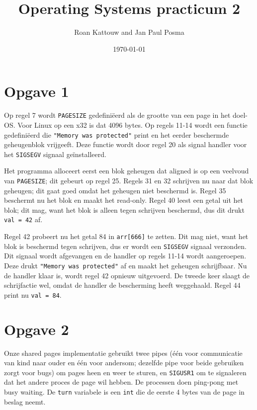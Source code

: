 \documentclass[11pt]{article}
\begin{document}
\author{Roan Kattouw and Jan Paul Posma}
\date{\today}
\title{Operating Systems practicum 2}

\maketitle

\section*{Opgave 1}
Op regel 7 wordt \verb+PAGESIZE+ gedefini\"eerd als de grootte van een page in het doel-OS.
Voor Linux op een x32 is dat 4096 bytes. Op regels 11-14 wordt een functie gedefini\"eerd die
\verb+"Memory was protected"+ print en het eerder beschermde geheugenblok vrijgeeft. Deze functie
wordt door regel 20 als signal handler voor het \verb+SIGSEGV+ signaal ge\"installeerd.

Het programma alloceert eerst een blok geheugen dat aligned is op een veelvoud van \verb+PAGESIZE+;
dit gebeurt op regel 25. Regels 31 en 32 schrijven nu naar dat blok geheugen; dit gaat goed
omdat het geheugen niet beschermd is. Regel 35 beschermt nu het blok en maakt het read-only.
Regel 40 leest een getal uit het blok; dit mag, want het blok is alleen tegen schrijven
beschermd, dus dit drukt \verb+val = 42+ af.

Regel 42 probeert nu het getal 84 in \verb+arr[666]+ te zetten. Dit mag niet, want het blok
is beschermd tegen schrijven, dus er wordt een \verb+SIGSEGV+ signaal verzonden. Dit signaal
wordt afgevangen en de handler op regels 11-14 wordt aangeroepen. Deze drukt \verb+"Memory was protected"+
af en maakt het geheugen schrijfbaar. Nu de handler klaar is, wordt regel 42 opnieuw uitgevoerd.
De tweede keer slaagt de schrijfactie wel, omdat de handler de bescherming heeft weggehaald.
Regel 44 print nu \verb+val = 84+.

\section*{Opgave 2}
Onze shared pages implementatie gebruikt twee pipes (\'e\'en voor communicatie van kind naar ouder en \'e\'en voor andersom;
dezelfde pipe voor beide gebruiken zorgt voor bugs) om pages heen en weer te sturen, en
\verb+SIGUSR1+ om te signaleren dat het andere proces de page wil hebben. De processen
doen ping-pong met busy waiting. De \verb+turn+ variabele is een \verb+int+ die de eerste
4 bytes van de page in beslag neemt.
\end{document}
